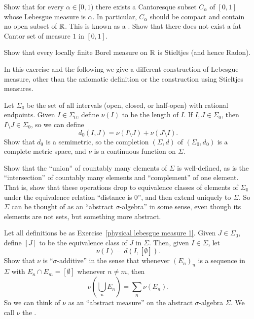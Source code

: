 \begin{exercise}\label{fat cat}
Show that for every $\alpha \in [0, 1)$ there exists a Cantoresque subset $C_{\alpha}$ of $[0, 1]$ whose Lebesgue measure is $\alpha$.
In particular, $C_{\alpha}$ should be compact and contain no open subset of $\mathbb{R}$.
This is known as a .
Show that there does not exist a fat Cantor set of measure $1$ in $[0, 1]$.
\end{exercise}

\begin{exercise}
Show that every locally finite Borel measure on $\mathbb{R}$ is Stieltjes (and hence Radon).
\end{exercise}

\begin{exercise}\label{physical lebesgue measure 1}
In this exercise and the following we give a different construction of Lebesgue measure, other than the axiomatic definition or the construction using Stieltjes measures.

Let $\Sigma_{0}$ be the set of all intervals (open, closed, or half-open) with rational endpoints.
Given $I \in \Sigma_{0}$, define $\nu(I)$ to be the length of $I$.
If $I, J \in \Sigma_{0}$, then $I \setminus J \in \Sigma_{0}$, so we can define
\[d_{0}(I, J) = \nu(I \setminus J) + \nu(J \setminus I).\]
Show that $d_{0}$ is a semimetric, so the completion $(\Sigma, d)$ of $(\Sigma_{0}, d_{0})$ is a complete metric space, and $\nu$ is a continuous function on $\Sigma$.

Show that the ``union'' of countably many elements of $\Sigma$ is well-defined, as is the ``intersection'' of countably many elements and ``complement'' of one element.
That is, show that these operations drop to equivalence classes of elements of $\Sigma_{0}$ under the equivalence relation ``distance is $0$'', and then extend uniquely to $\Sigma$.
So $\Sigma$ can be thought of as an ``abstract $\sigma$-algebra'' in some sense, even though its elements are not sets, but something more abstract.
\end{exercise}

\begin{exercise}\label{physical lebesgue measure 2}
Let all definitions be as Exercise~\ref{physical lebesgue measure 1}.
Given $J \in \Sigma_{0}$, define $[J]$ to be the equivalence class of $J$ in $\Sigma$.
Then, given $I \in \Sigma$, let
\[\nu(I) = d(I, [\emptyset]).\]
Show that $\nu$ is ``$\sigma$-additive'' in the sense that whenever ${(E_{n})}_{n}$ is a sequence in $\Sigma$ with $E_{n} \cap E_{m} = [\emptyset]$ whenever $n \neq m$, then
\[\nu\left(\bigcup_{n} E_{n}\right) = \sum_{n} \nu(E_{n}).\]
So we can think of $\nu$ as an ``abstract measure'' on the abstract $\sigma$-algebra $\Sigma$.
We call $\nu$ the .
\end{exercise}

